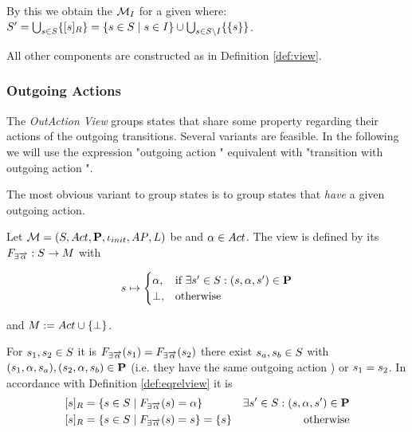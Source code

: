 \documentclass[preview]{standalone}
\begin{document}
By this we obtain the \viewN ${{{{{\mathcal{M}}}}_{{I}}}}$ for a given \chosengraphtypeN \chgph where: ${S}' = \bigcup_{{s} \in {S}} \{{{[{s}]_{{R}}}}\} = \{{s} \in {S} \mid {s} \in {I}\}\cup \bigcup_{{s} \in {S} \setminus {I}}\{\{{s}\}\}$.

All other components are constructed as in Definition \ref{def:view}.

\subsubsection{Outgoing Actions}
The \emph{OutAction View} groups states that share some property regarding their actions  of the outgoing transitions. Several variants are feasible. In the following we will use the expression "outgoing action \action" equivalent with "transition with outgoing action \action".

The most obvious variant to group states is to group states that \emph{have} a given outgoing action. 

\begin{definition}
	Let ${{{\mathcal{M}}}} = {{({S}, {Act}, {\textbf{P}}, {\iota_{init}}, {AP}, {L})}}$ be \chosengraphtypeN and ${\alpha} \in {Act}$. The view \viewhasoutaction is defined by its \grpfctN ${{F_{\exists{\overrightarrow{\ensuremath{{\alpha}}}}}}} : {S} \to {\ensuremath{{M}}}$ with 
	
	\[
	{s} \mapsto
	\begin{cases}
		{\alpha},				& \text{if } \exists {s}' \in {S}: ({s}, {\alpha}, {s}') \in {\ensuremath{{\textbf{P}}}} \\
		{\bot},          	& \text{otherwise}
	\end{cases}
	\]
	
	and ${{M}} := {{Act} \cup {\{\bot\}}}$.	
\end{definition}


For ${s}_1,{s}_2 \in {S}$ it is ${{F_{\exists{\overrightarrow{\ensuremath{{\alpha}}}}}}}({s}_1) = {{F_{\exists{\overrightarrow{\ensuremath{{\alpha}}}}}}}({s}_2)$ \iffN 
there exist ${s}_{a},{s}_{b} \in {S}$ with 
$({s}_1, {\alpha}, {s}_{a}), ({s}_2, {\alpha}, {s}_{b}) \in {\ensuremath{{\textbf{P}}}}$ (i.e. they have the same outgoing action \action) or ${s}_1 = {s}_2$. 
In accordance with Definition \ref{def:eqrelview} it is
\begin{align*}
	{\ensuremath{{[{s}]_{{R}}}}} &= \{{s} \in {S} \mid {\ensuremath{{F_{\exists{\overrightarrow{\ensuremath{{\alpha}}}}}}}}({s}) = {\alpha}\} &\exists{s}' \in {S} : ({s}, {\alpha}, {s}') \in {\ensuremath{{\textbf{P}}}} \\
	{{[{s}]_{{R}}}} &= \{{s} \in {S} \mid {\ensuremath{{F_{\exists{\overrightarrow{\ensuremath{{\alpha}}}}}}}}({s}) = {s}\} = \{s\} &\text{ otherwise}
\end{align*}
\end{document}
